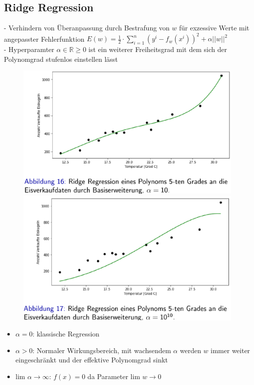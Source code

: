 \documentclass{report}
\begin{document}
\subsection{Ridge Regression}
- Verhindern von Überanpassung durch Bestrafung von $w$ für exzessive Werte mit angepasster Fehlerfunktion
$E(w) = \frac{1}{2}\cdot \sum_{i=1}^n(y^i - f_w(x^i))^2 + \alpha ||w||^2$\\
- Hyperparamter $\alpha \in \mathbb{R} \geq 0$ ist ein weiterer Freiheitsgrad mit dem sich der Polynomgrad stufenlos einstellen lässt
\begin{figure}[H]
  \centering
  \begin{minipage}[b]{0.4\textwidth}
    \includegraphics[scale=.215]{ml02_10}
  \end{minipage}
  \hfill
  \begin{minipage}[b]{0.4\textwidth}
    \includegraphics[scale=.215]{ml02_11}
  \end{minipage}
\end{figure}
\begin{itemize}
  \item $\alpha = 0$: klassische Regression
  \item $\alpha > 0$: Normaler Wirkungsbereich, mit wachsendem $\alpha$ werden $w$ immer weiter eingeschränkt und der effektive Polynomgrad sinkt
  \item lim $\alpha \rightarrow \infty$: $f(x) = 0$ da Parameter lim $w \rightarrow 0$
\end{itemize}
\end{document}
